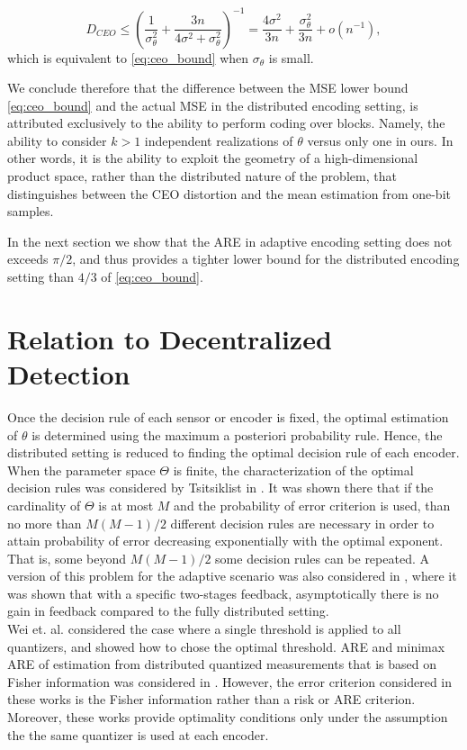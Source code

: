 \documentclass[letterpaper, conference]{IEEEtran}      %
\begin{document}
\[
D_{CEO} \leq  \left( \frac{1}{\sigma_\theta^2} +  \frac{3n}{4\sigma^2 + \sigma_\theta^2} \right)^{-1}   =
\frac{4 \sigma^2}{3n} +  \frac{\sigma_\theta^2}{3n} + o(n^{-1}),
\]
which is equivalent to \eqref{eq:ceo_bound} when $\sigma_\theta$ is small. \par
We conclude therefore that the difference between the MSE lower bound \eqref{eq:ceo_bound} and the actual MSE in the distributed encoding setting, is attributed exclusively to the ability to perform coding over blocks. Namely, the ability to consider $k>1$ independent realizations of $\theta$ versus only one in ours. In other words, it is the ability to exploit the geometry of a high-dimensional product space, rather than the distributed nature of the problem, that distinguishes between the CEO distortion and the mean estimation from one-bit samples.\par
In the next section we show that the ARE in adaptive encoding setting does not exceeds $\pi/2$, and thus provides a tighter lower bound for the distributed encoding setting than $4/3$ of  \eqref{eq:ceo_bound}. 

\section{Relation to Decentralized Detection}
Once the decision rule of each sensor or encoder is fixed, the optimal estimation of $\theta$ is determined using the maximum a posteriori probability rule. Hence, the distributed setting is reduced to finding the optimal decision rule of each encoder. When the parameter space $\Theta$ is finite, the characterization of the optimal decision rules was considered by Tsitsiklist in \cite{tsitsiklis1988decentralized}. It was shown there that if the cardinality of $\Theta$ is at most $M$ and the probability of error criterion is used, than no more than $M(M-1)/2$ different decision rules are necessary in order to attain probability of error decreasing exponentially with the optimal exponent. That is, some beyond $M(M-1)/2$ some decision rules can be repeated. A version of this problem for the adaptive scenario was also considered in \cite{5751320}, where it was shown that with a specific two-stages feedback, asymptotically there is no gain in feedback compared to the fully distributed setting. 
 \\
Wei et. al. \cite{904560} considered the case where a single threshold is applied to all quantizers, and showed how to chose the optimal threshold. ARE and minimax ARE of estimation from distributed quantized measurements that is based on Fisher information was considered in \cite{4244748, 6882252, chen2010performance, 5184907}. However, the error criterion considered in these works is the Fisher information rather than a risk or ARE criterion. Moreover, these works provide optimality conditions only under the assumption the the same quantizer is used at each encoder. 
\end{document}
